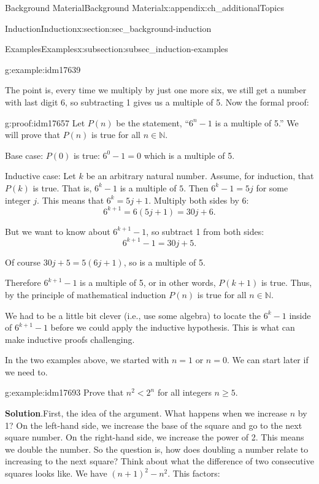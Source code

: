 \documentclass[oneside,10pt,]{book}
\numberwithin{equation}{chapter}
\def\N{\mathbb N}
\newcommand{\lt}{<}
\begin{document}
\begin{appendixptx}{Background Material}{}{Background Material}{}{}{x:appendix:ch_additionalTopics}
\begin{sectionptx}{Induction}{}{Induction}{}{}{x:section:sec_background-induction}
\begin{subsectionptx}{Examples}{}{Examples}{}{}{x:subsection:subsec_induction-examples}
\begin{example}{}{g:example:idm17639}
\par
The point is, every time we multiply by just one more six, we still get a number with last digit 6, so subtracting 1 gives us a multiple of 5. Now the formal proof:%
\begin{proofptx}{}{g:proof:idm17657}
Let \(P(n)\) be the statement, ``\(6^n - 1\) is a multiple of 5.'' We will prove that \(P(n)\) is true for all \(n \in \N\).%
\par
Base case: \(P(0)\) is true: \(6^0 -1 = 0\) which is a multiple of 5.%
\par
Inductive case: Let \(k\) be an arbitrary natural number. Assume, for induction, that \(P(k)\) is true. That is, \(6^k - 1\) is a multiple of \(5\). Then \(6^k - 1 = 5j\) for some integer \(j\). This means that \(6^k = 5j + 1\). Multiply both sides by \(6\):%
\begin{equation*}
6^{k+1} = 6(5j+1) = 30j + 6.
\end{equation*}
%
\par
But we want to know about \(6^{k+1} - 1\), so subtract 1 from both sides:%
\begin{equation*}
6^{k+1} - 1 = 30j + 5.
\end{equation*}
%
\par
Of course \(30j+5 = 5(6j+1)\), so is a multiple of 5.%
\par
Therefore \(6^{k+1} - 1\) is a multiple of 5, or in other words, \(P(k+1)\) is true. Thus, by the principle of mathematical induction \(P(n)\) is true for all \(n \in \N\).%
\end{proofptx}
\end{example}
We had to be a little bit clever (i.e., use some algebra) to locate the \(6^k - 1\) inside of \(6^{k+1} - 1\) before we could apply the inductive hypothesis. This is what can make inductive proofs challenging.%
\par
In the two examples above, we started with \(n = 1\) or \(n = 0\). We can start later if we need to.%
\begin{example}{}{g:example:idm17693}%
Prove that \(n^2 \lt  2^n\) for all integers \(n \ge 5\).%
\par\smallskip%
\noindent\textbf{Solution}.\hypertarget{g:solution:idm17698}{}\quad{}First, the idea of the argument. What happens when we increase \(n\) by 1? On the left-hand side, we increase the base of the square and go to the next square number. On the right-hand side, we increase the power of 2. This means we double the number. So the question is, how does doubling a number relate to increasing to the next square? Think about what the difference of two consecutive squares looks like. We have \((n+1)^2 - n^2\). This factors:%

\end{example}
\end{subsectionptx}
\end{sectionptx}
\end{appendixptx}
\end{document}
